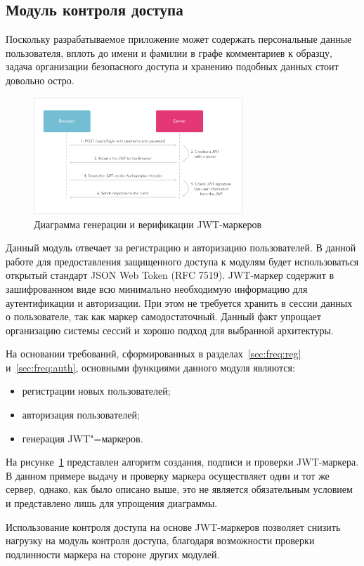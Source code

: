 \subsection{Модуль контроля доступа}
Поскольку разрабатываемое приложение может содержать персональные данные пользователя, вплоть до имени и фамилии в графе комментариев к образцу, задача организации безопасного доступа и хранению подобных данных стоит довольно остро.
\begin{figure}[ht]
    \centering
    \includegraphics[width=0.7\textwidth]{figures/jwt_diagram.png}
    \caption{Диаграмма генерации и верификации JWT-маркеров}
    \label{fig:architecture:jwt_diagram}
\end{figure}
Данный модуль отвечает за регистрацию и авторизацию пользователей. 
В данной работе для предоставления защищенного доступа к модулям будет использоваться открытый стандарт JSON Web Token (RFC 7519). JWT-маркер  содержит в зашифрованном виде всю минимально необходимую информацию для аутентификации и авторизации. При этом не требуется хранить в сессии данных о пользователе, так как маркер самодостаточный. Данный факт упрощает организацию системы сессий и хорошо подход для выбранной архитектуры.

На основании требований, сформированных в разделах~\ref{sec:freq:reg} и~\ref{sec:freq:auth}, основными функциями данного модуля являются:
\begin{itemize}
  \item регистрации новых пользователей;
  \item авторизация пользователей;
  \item генерация JWT"=маркеров.
\end{itemize}


На рисунке~\ref{fig:architecture:jwt_diagram} представлен алгоритм создания, подписи и проверки JWT-маркера. В данном примере выдачу и проверку маркера осуществляет один и тот же сервер, однако, как было описано выше, это не является обязательным условием и представлено лишь для упрощения диаграммы.

Использование контроля доступа на основе JWT-маркеров позволяет снизить нагрузку на модуль контроля доступа, благодаря возможности проверки подлинности маркера на стороне других модулей.